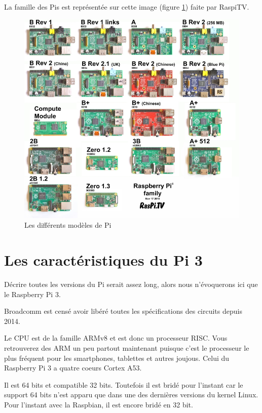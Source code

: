 La famille des Pis est représentée sur cette image (figure \ref{img_family}) faite par RaspiTV.

\begin{center}
\begin{figure}
	\includegraphics{images/pi-family}
	\caption{Les différents modèles de Pi}
	\label{img_family}
\end{figure}
\end{center}

\section{Les caractéristiques du Pi 3}

Décrire toutes les versions du Pi serait assez long, alors nous n'évoquerons ici que le Raspberry Pi 3.

Broadcomm est censé avoir libéré toutes les spécifications des circuits depuis 2014.

Le CPU est de la famille ARMv8 et est donc un processeur RISC. Vous retrouverez des ARM un peu partout maintenant puisque c'est le processeur le plus fréquent pour les smartphones, tablettes et autres joujous. Celui du Raspberry Pi 3 a quatre coeurs Cortex A53.

Il est 64 bits et compatible 32 bits. Toutefois il est bridé pour l'instant car le support 64 bits n'est apparu que dans une des dernières versions du kernel Linux. Pour l'instant avec la Raspbian, il est encore bridé en 32 bit.

